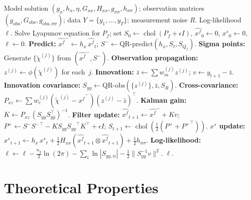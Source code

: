 \documentclass[12pt,a4paper]{article}
\newcommand{\kron}{\otimes}
\newcommand{\xf}{{x^{f}}}
\newcommand{\xs}{{x^{s}}}
\newcommand{\gx}{g_x}
\newcommand{\hx}{h_x}
\newcommand{\Gxx}{G_{xx}}
\newcommand{\Hxx}{H_{xx}}
\newcommand{\gss}{{g_{\sigma\sigma}}}
\newcommand{\hsig}{{h_{\sigma\sigma}}}
\DeclareMathOperator{\chol}{chol}
\begin{document}
\begin{algorithm}[htbp]
\caption{Pruned Square-Root UKF for Second-Order DSGE}
\label{alg:pruned-sr-ukf}
\begin{algorithmic}[1]
\Require Model solution
$(\gx, \hx, \eta, \Gxx, \Hxx, \gss, \hsig)$;
observation matrices $(g_{\text{obs}}, G_{\text{obs}}, g_{\text{obs},\sigma\sigma})$;
data $Y = \{y_1, \ldots, y_T\}$;
measurement noise $R$.
\Ensure Log-likelihood $\ell$.
\State Solve Lyapunov equation for $P_f$; set
$S_0 \leftarrow \chol(P_f + \epsilon I)$,
$\hat{\xf}_0 \leftarrow 0$,
$\xs_0 \leftarrow 0$,
$\ell \leftarrow 0$.
  \State \textbf{Predict:}
    $\hat{\xf}^- \leftarrow \hx\,\hat{\xf}_t$; \quad
    $S^- \leftarrow \text{QR-predict}(\hx, S_t, S_{Q_f})$.
  \State \textbf{Sigma points:}
    Generate $\{\tilde\chi^{(j)}\}$ from $(\hat{\xf}^-, S^-)$.
  \State \textbf{Observation propagation:}
    $z^{(j)} \leftarrow \phi(\tilde\chi^{(j)})$ for each~$j$.
  \State \textbf{Innovation:}
    $\bar{z} \leftarrow \sum w_m^{(j)} z^{(j)}$; \quad
    $v \leftarrow y_{t+1} - \bar{z}$.
  \State \textbf{Innovation covariance:}
    $S_{yy} \leftarrow \text{QR-obs}(\{z^{(j)}\}, \bar{z}, S_R)$.
  \State \textbf{Cross-covariance:}
    $P_{xz} \leftarrow \sum w_c^{(j)}
      (\tilde\chi^{(j)} - \hat{\xf}^-)
      (z^{(j)} - \bar{z})^\top$.
  \State \textbf{Kalman gain:}
    $K \leftarrow P_{xz}\,(S_{yy} S_{yy}^\top)^{-1}$.
  \State \textbf{Filter update:}
    $\hat{\xf}_{t+1} \leftarrow \hat{\xf}^- + K v$; \quad
    $P^+ \leftarrow S^- {S^-}^\top - K S_{yy} {S_{yy}}^\top K^\top
      + \epsilon I$; \quad
    $S_{t+1} \leftarrow \chol(\tfrac{1}{2}(P^+ + {P^+}^\top))$.
  \State \textbf{$\xs$ update:}
    $\xs_{t+1} \leftarrow \hx\,\xs_t
      + \frac{1}{2}\Hxx(\hat{\xf}_{t+1} \kron \hat{\xf}_{t+1})
      + \frac{1}{2}\hsig$.
  \State \textbf{Log-likelihood:}
    $\ell \leftarrow \ell - \frac{n_y}{2}\ln(2\pi)
      - \sum_i \ln|S_{yy,ii}|
      - \frac{1}{2}\|S_{yy}^{-1} v\|^2$.
\EndFor
\State \Return $\ell$.
\end{algorithmic}
\end{algorithm}


\section{Theoretical Properties}\label{sec:theory}
\end{document}

